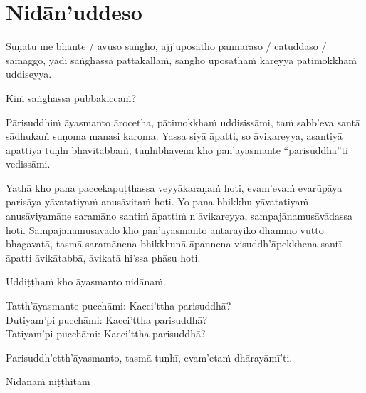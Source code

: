 \section{Nidān'uddeso}
\label{nidan'uddeso}

Suṇātu me bhante / āvuso saṅgho, ajj'uposatho pannaraso / cātuddaso / sāmaggo, yadi saṅghassa pattakallaṁ, saṅgho uposathaṁ kareyya pātimokkhaṁ uddiseyya.

Kiṁ saṅghassa pubbakiccaṁ?

Pārisuddhiṁ āyasmanto ārocetha, pātimokkhaṁ uddisissāmi, taṁ sabb'eva santā sādhukaṁ suṇoma manasi karoma. Yassa siyā āpatti, so āvikareyya, asantiyā āpattiyā tuṇhī bhavitabbaṁ, tuṇhībhāvena kho pan'āyasmante “parisuddhā”ti vedissāmi.

Yathā kho pana paccekapuṭṭhassa veyyākaraṇaṁ hoti, evam'evaṁ evarūpāya parisāya yāvatatiyaṁ anusāvitaṁ hoti. Yo pana bhikkhu yāvatatiyaṁ anusāviyamāne saramāno santiṁ āpattiṁ n'āvikareyya, sampajānamusāvādassa hoti. Sampajānamusāvādo kho pan'āyasmanto antarāyiko dhammo vutto bhagavatā, tasmā saramānena bhikkhunā āpannena visuddh'āpekkhena santī āpatti āvikātabbā, āvikatā hi'ssa phāsu hoti.

\medskip

\begin{center}
Uddiṭṭhaṁ kho āyasmanto nidānaṁ.

\smallskip

Tatth'āyasmante pucchāmi: Kacci'ttha parisuddhā?\\
Dutiyam'pi pucchāmi: Kacci'ttha parisuddhā?\\
Tatiyam'pi pucchāmi: Kacci'ttha parisuddhā?

\smallskip

Parisuddh'etth'āyasmanto, tasmā tuṇhī, evam'etaṁ dhārayāmī'ti.
\end{center}

\begin{outro}
  Nidānaṁ niṭṭhitaṁ
\end{outro}

\clearpage

